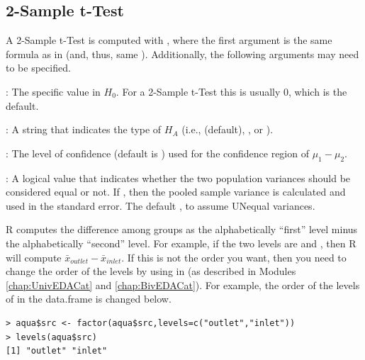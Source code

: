 \documentclass[10pt,openany]{book}\usepackage[]{graphicx}\usepackage[]{color}
\makeatletter
\newenvironment{kframe}{%
 \def\at@end@of@kframe{}%
 \ifinner\ifhmode%
  \def\at@end@of@kframe{\end{minipage}}%
  \begin{minipage}{\columnwidth}%
 \fi\fi%
 \def\FrameCommand##1{\hskip\@totalleftmargin \hskip-\fboxsep
 \colorbox{shadecolor}{##1}\hskip-\fboxsep
     \hskip-\linewidth \hskip-\@totalleftmargin \hskip\columnwidth}%
 \MakeFramed {\advance\hsize-\width
   \@totalleftmargin\z@ \linewidth\hsize
   \@setminipage}}%
 {\par\unskip\endMakeFramed%
 \at@end@of@kframe}
\newenvironment{knitrout}{}{} %
\makeatother
\begin{document}
\subsection{2-Sample t-Test}
\vspace*{-4pt}
A 2-Sample t-Test is computed with , where the first argument is the same formula as in  (and, thus, same ). Additionally, the following arguments may need to be specified.
\vspace*{-8pt}
\begin{Itemize}
  \item {}: The specific value in $H_{0}$. For a 2-Sample t-Test this is usually 0, which is the default.
  \item {}: A string that indicates the type of $H_{A}$ (i.e.,  (default), , or ).
  \item {}: The level of confidence (default is ) used for the confidence region of $\mu_{1}-\mu_{2}$.
  \item {}: A logical value that indicates whether the two population variances should be considered equal or not. If , then the pooled sample variance is calculated and used in the standard error. The default , to assume UNequal variances.
\end{Itemize}

\vspace*{-8pt}

R computes the difference among groups as the alphabetically ``first'' level minus the alphabetically ``second'' level. For example, if the two levels are  and , then R will compute $\bar{x}_{outlet}-\bar{x}_{inlet}$. If this is not the order you want, then you need to change the order of the levels by using  in  (as described in Modules \ref{chap:UnivEDACat} and \ref{chap:BivEDACat}). For example, the order of the levels of  in the  data.frame is changed below.
\begin{knitrout}
\color{fgcolor}\begin{kframe}
\begin{verbatim}
> aqua$src <- factor(aqua$src,levels=c("outlet","inlet"))
> levels(aqua$src)
[1] "outlet" "inlet" 
\end{verbatim}
\end{kframe}
\end{knitrout}
\end{document}
